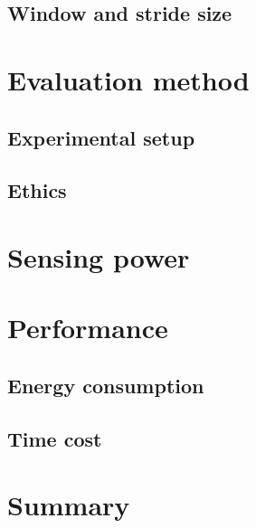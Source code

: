 \subsection{Window and stride size}

\section{Evaluation method}
\subsection{Experimental setup}
\subsection{Ethics}

\section{Sensing power}
\section{Performance}
\subsection{Energy consumption}
\subsection{Time cost}
\section{Summary}